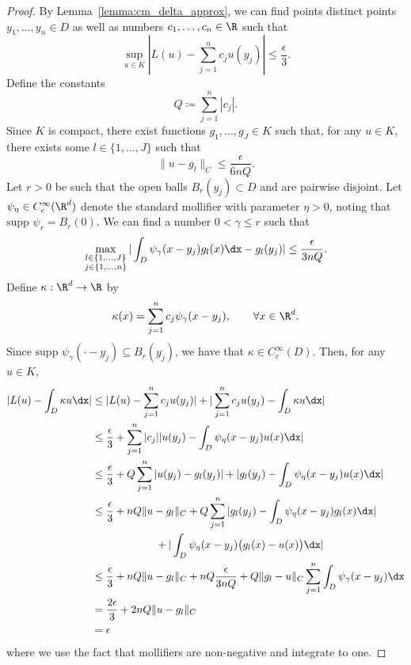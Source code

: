 \begin{proof}
By Lemma~\ref{lemma:cm_delta_approx}, we can find points distinct points 
\(y_1, \dots, y_n \in D\) as well
as numbers \(c_1,\dots,c_n \in \R\) such that
\[\sup_{u \in K} |L(u) - \sum_{j=1}^{n} c_{j} u(y_{j})| \leq \frac{\epsilon}{3}.\]
Define the constants
\[Q \coloneqq \sum_{j=1}^n |c_{j}|.\]
Since \(K\) is compact, there exist functions \(g_1,\dots,g_J \in K\) such that, for any \(u \in K\), there exists 
some \(l \in \{1,\dots,J\}\) such that
\[\|u - g_l\|_{C} \leq \frac{\epsilon}{6nQ}.\]
Let \(r > 0\) be such that the open balls \(B_r (y_{j}) \subset D\) and are pairwise disjoint.
Let \(\psi_\eta \in C^\infty_c (\R^d)\) denote the standard mollifier with parameter \(\eta > 0\), noting that \(\text{supp } \psi_r = B_r(0)\). We can find a number \(0 < \gamma \leq r\) such that
\[\max_{\substack{l \in \{1,\dots,J\} \\ j \in \{1,\dots,n\}}} |\int_D \psi_{\gamma}(x - y_{j}) g_l(x) \dx - g_l(y_{j})| \leq \frac{\epsilon}{3nQ}.\]
Define \(\kappa : \R^d \to \R\) by
\[\kappa(x) = \sum_{j=1}^n c_{j} \psi_{\gamma}(x - y_{j}), \qquad \forall x \in \R^d.\]
Since \(\text{supp } \psi_\gamma (\cdot - y_j) \subseteq B_r(y_j)\), we have that \(\kappa \in C^\infty_c(D)\).
Then, for any \(u \in K\),
\begin{align*}
|L(u) - \int_D \kappa u \dx| &\leq |L({}u) - \sum_{j=1}^n c_j u(y_j) | + |\sum_{j=1}^n c_j u(y_j) - \int_D \kappa u \dx| \\
&\leq \frac{\epsilon}{3} + \sum_{j=1}^n |c_j| |u(y_j) - \int_D \psi_\eta(x - y_j)u(x) \dx| \\
&\leq \frac{\epsilon}{3} + Q \sum_{j=1}^n |u(y_j) - g_l(y_j)| + |g_l(y_j) - \int_D \psi_\eta(x - y_j)u(x) \dx| \\
&\leq \frac{\epsilon}{3} + nQ \|u - g_l\|_{C} + Q \sum_{j=1}^n |g_l(y_j) - \int_D \psi_\eta (x - y_j)g_l(x) \dx|\\
&\quad\quad\quad\quad\quad\quad+ | \int_D \psi_\eta (x - y_j) \bigl (g_l(x) - u(x) \bigl) \dx| \\
&\leq \frac{\epsilon}{3} + nQ \|u - g_l\|_{C} + n Q \frac{\epsilon}{3n Q} + Q \|g_l - u\|_C \sum_{j=1}^n \int_D \psi_{\gamma}(x - y_{j}) \dx \\
&= \frac{2\epsilon}{3} + 2nQ \|u - g_l\|_{C} \\
&=\epsilon
\end{align*}
where we use the fact that mollifiers are non-negative and integrate to one.
\end{proof}

